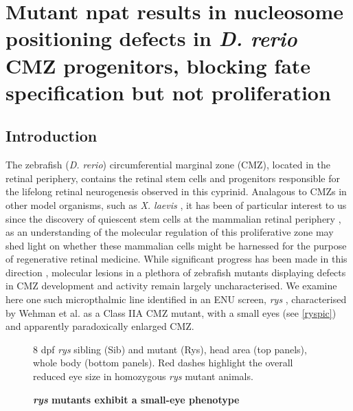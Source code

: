 \chapter{Mutant npat results in nucleosome positioning defects in \textit{D. rerio} CMZ progenitors, blocking fate specification but not proliferation}
\label{chap:rys}
\section{Introduction}
The zebrafish (\textit{D. rerio}) circumferential marginal zone (CMZ), located in the retinal periphery, contains the retinal stem cells and progenitors responsible for the lifelong retinal neurogenesis observed in this cyprinid. Analagous to CMZs in other model organisms, such as \textit{X. laevis} \cite{Perron1998}, it has been of particular interest to us since the discovery of quiescent stem cells at the mammalian retinal periphery \cite{Tropepe2000}, as an understanding of the molecular regulation of this proliferative zone may shed light on whether these mammalian cells might be harnessed for the purpose of regenerative retinal medicine. While significant progress has been made in this direction \cite{Raymond2006}, molecular lesions in a plethora of zebrafish mutants displaying defects in CMZ development and activity remain largely uncharacterised. We examine here one such micropthalmic line identified in an ENU screen, \textit{rys} \cite{Wehman2005}, characterised by Wehman et al. as a Class IIA CMZ mutant, with a small eyes (see \autoref{ryspic}) and apparently paradoxically enlarged CMZ.

\begin{figure}[!h]
    \caption{{\bf \textit{rys} mutants exhibit a small-eye phenotype}}
    \label{ryspic}
    8 dpf \textit{rys} sibling (Sib) and mutant (Rys), head area (top panels), whole body (bottom panels). Red dashes highlight the overall reduced eye size in homozygous \textit{rys} mutant animals.
\end{figure}

